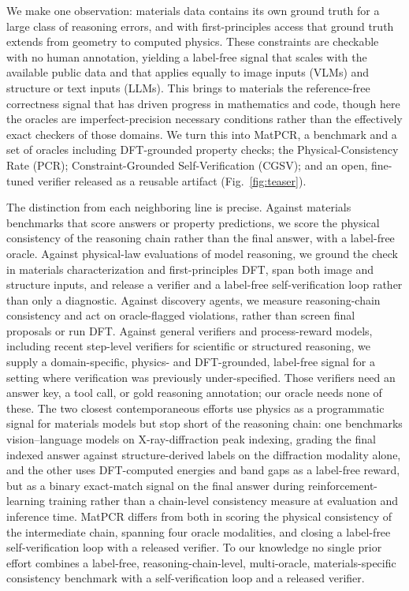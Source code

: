 \documentclass[pdflatex,sn-nature]{sn-jnl}
\begin{document}
We make one observation: materials data contains its own
ground truth for a large class of reasoning errors, and with first-principles access
that ground truth extends from geometry to computed physics. These constraints are
checkable with no human annotation, yielding a label-free signal that scales with the
available public data and that applies equally to image inputs (VLMs) and
structure or text inputs (LLMs). This brings to materials the reference-free correctness
signal that has driven progress in mathematics and code, though here the oracles are
imperfect-precision necessary conditions rather than the effectively exact checkers of
those domains. We turn this into MatPCR, a benchmark and a set of
oracles including DFT-grounded property checks; the Physical-Consistency Rate (PCR);
Constraint-Grounded Self-Verification (CGSV); and an open, fine-tuned verifier
released as a reusable artifact (Fig.~\ref{fig:teaser}).

The distinction from each neighboring line is precise. Against materials benchmarks
that score answers or property predictions,\cite{lai2025materials,llm4matbench2024,atomworld2025,matterchat2026}
we score the physical consistency of the reasoning chain rather than the final
answer, with a label-free oracle. Against physical-law evaluations of model
reasoning,\cite{conservationbench2026,p1vl2026} we ground the check in materials
characterization and first-principles DFT, span both image and structure inputs, and
release a verifier and a label-free self-verification loop rather than only a diagnostic.
Against discovery agents,\cite{dreams2025,physrej2025} we measure reasoning-chain
consistency and act on oracle-flagged violations, rather than screen final proposals or
run DFT. Against general verifiers
and process-reward models,\cite{processbench2025,compassverifier2025,t1verify2025}
including recent step-level verifiers for scientific or structured reasoning,\cite{sciprm2026,vprm2026}
we supply a domain-specific, physics- and DFT-grounded, label-free signal for a setting
where verification was previously under-specified. Those verifiers need an answer key, a
tool call, or gold reasoning annotation; our oracle needs none of these. The two closest contemporaneous
efforts use physics as a programmatic signal for materials models but stop short of the
reasoning chain: one benchmarks vision--language models on X-ray-diffraction peak
indexing, grading the final indexed answer against structure-derived labels on the
diffraction modality alone,\cite{crystalxrdbench2026} and the other uses DFT-computed
energies and band gaps as a label-free reward, but as a binary exact-match signal on the
final answer during reinforcement-learning training rather than a chain-level
consistency measure at evaluation and inference time.\cite{matpref2026} MatPCR differs
from both in scoring the physical consistency of the intermediate chain, spanning four
oracle modalities, and closing a label-free self-verification loop with a released
verifier. To our knowledge no single prior effort combines a label-free,
reasoning-chain-level, multi-oracle, materials-specific consistency benchmark with a
self-verification loop and a released verifier.
\end{document}
